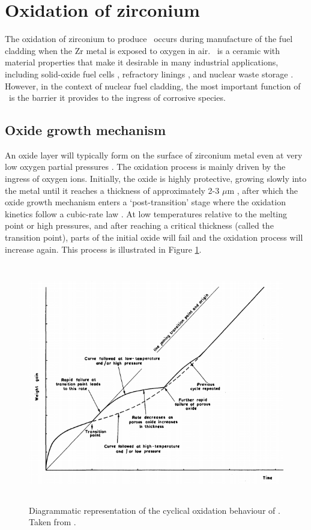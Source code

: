 \section{Oxidation of zirconium}

The oxidation of zirconium to produce \zirconia\ occurs during manufacture of the fuel cladding when the Zr metal is exposed to oxygen in air. \zirconia\ is a ceramic with material properties that make it desirable in many industrial applications, including solid-oxide fuel cells \cite{radford1979zirconia}, refractory linings \cite{whittemore1952fused}, and nuclear waste storage \cite{wang2012ceramics}. However, in the context of nuclear fuel cladding, the most important function of \zirconia\ is the barrier it provides to the ingress of corrosive species. 


\subsection{Oxide growth mechanism}

An oxide layer will typically form on the surface of zirconium metal even at very low oxygen partial pressures \cite{causey2005review}. The oxidation process is mainly driven by the ingress of oxygen ions. Initially, the oxide is highly protective, growing slowly into the metal until it reaches a thickness of approximately 2-3 $\mu$m \cite{garzarolli1991oxide,dawson1968kinetics}, after which the oxide growth mechanism enters a `post-transition' stage where the oxidation kinetics follow a cubic-rate law  \cite{porte1960oxidation}. At low temperatures relative to the melting point or high pressures, and after reaching a critical thickness (called the transition point), parts of the initial oxide will fail and the oxidation process will increase again. This process is illustrated in Figure \ref{figure:oxide_weight_gain}. 

\begin{figure}[htp]
\centering
\includegraphics[height=10.5cm]{images/zro2_oxide_weight_gain.png}
\caption[Diagrammatic representation of the cyclical oxidation behaviour of \zirconia .]{Diagrammatic representation of the cyclical oxidation behaviour of \zirconia . Taken from \cite{cox1963some}.}
\label{figure:oxide_weight_gain}
\end{figure}

